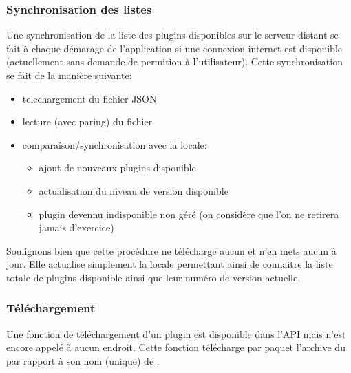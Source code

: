 \subsubsection{Synchronisation des listes}
Une synchronisation de la liste des plugins disponibles sur le serveur distant se fait à chaque démarage de l'application si une connexion internet est disponible (actuellement sans demande de permition à l'utilisateur).
Cette synchronisation se fait de la manière suivante:
\begin{itemize}
    \item telechargement du fichier JSON
    \item lecture (avec paring) du fichier
    \item comparaison/synchronisation avec la \bdd{} locale:
    \begin{itemize}
        \item ajout de nouveaux plugins disponible
        \item actualisation du niveau de version disponible
        \item plugin devennu indisponible non géré (on considère que l'on ne retirera jamais d'exercice)
    \end{itemize}
\end{itemize}
Soulignons bien que cette procédure ne télécharge aucun \plugin{} et n'en mets aucun à jour. Elle actualise simplement la \bdd{} locale permettant ainsi de connaitre la liste totale de plugins disponible ainsi que leur numéro de version actuelle.

\subsubsection{Téléchargement}
\label{importation_plugin-telechargement}
Une fonction de téléchargement d'un plugin est disponible dans l'API mais n'est encore appelé à aucun endroit. Cette fonction télécharge par paquet l'archive du \plugin{} par rapport à son nom (unique) de \plugin{}.

